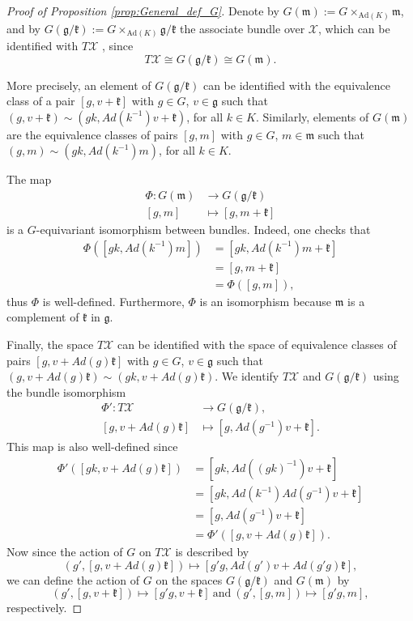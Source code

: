 \documentclass[oneside,11pt]{amsart}
\theoremstyle{definition}
\theoremstyle{remark}
\numberwithin{thm}{section}
\numberwithin{equation}{section}
\begin{document}
\begin{proof}[Proof of Proposition \ref{prop:General_def_G}]
Denote by $G(\mathfrak{m}):=G\times_{\mathrm{Ad}(K)}\mathfrak{m}$, and by $G(\mathfrak{g}/\mathfrak{k}):=G\times_{\mathrm{Ad}(K)}\mathfrak{g}/\mathfrak{k}$ the associate bundle over $\mathcal{X}$, which can be identified with $T\mathcal{X}$ {\cite[Section 1]{BR90}}, since
\begin{equation}\label{identification of TX}
    T\mathcal{X}\cong G(\mathfrak{g}/\mathfrak{k})\cong G(\mathfrak{m}).
\end{equation}

\noindent More precisely, an element of $G(\mathfrak{g}/\mathfrak{k})$ can be identified with the equivalence class of a pair $[g,v+\mathfrak{k}]$ with $g\in G$, $v\in\mathfrak g$ such that $(g,v+\mathfrak{k})\sim (gk,Ad(k^{-1})v+\mathfrak{k})$, for all $k\in K$.
Similarly, elements of $G(\mathfrak{m})$ are the equivalence classes of pairs $[g,m]$ with $g\in G$, $m\in\mathfrak m$ such that $(g,m)\sim (gk,Ad(k^{-1})m)$, for all $k\in K$. 

\noindent The map 
\begin{align*}
    \Phi\colon G(\mathfrak{m})&\to G(\mathfrak{g}/\mathfrak{k})\\
    [g,m]&\mapsto [g,m+\mathfrak k]
\end{align*}
is a $G$-equivariant isomorphism between bundles. Indeed, one checks that 
\begin{align*}
    \Phi([gk,Ad(k^{-1})m])&=[gk,Ad(k^{-1})m+\mathfrak k]\\
    &=[g,m+\mathfrak k]\\
    &=\Phi([g,m]),
\end{align*}
thus $\Phi$ is well-defined. Furthermore, $\Phi$ is an isomorphism because $\mathfrak m$ is a complement of $\mathfrak k$ in $\mathfrak g$. 

\noindent Finally, the space $T\mathcal X$ can be identified with the space of equivalence classes of pairs $[g,v+Ad(g)\mathfrak k]$ with $g\in G$, $v\in\mathfrak g$ such that $(g,v+Ad(g)\mathfrak k)\sim (gk,v+Ad(g)\mathfrak k)$. We identify $T\mathcal X$ and $G(\mathfrak{g}/\mathfrak{k})$ using the bundle isomorphism 
\begin{align*}
\Phi'\colon T\mathcal X & \to G(\mathfrak{g}/\mathfrak{k}),\\ [g,v+Ad(g)\mathfrak k] & \mapsto [g,Ad(g^{-1})v+\mathfrak k].
\end{align*} 
This map is also well-defined since
\begin{align*}
\Phi'([gk,v+Ad(g)\mathfrak k]) & =[gk,Ad((gk)^{-1})v+\mathfrak k]\\
& = [gk,Ad(k^{-1})Ad(g^{-1})v+\mathfrak k]\\
& = [g,Ad(g^{-1})v+\mathfrak k]\\
& = \Phi'([g,v+Ad(g)\mathfrak k]).
\end{align*}
Now since the action of $G$ on $T\mathcal X$ is described by 
\[(g',[g,v+Ad(g)\mathfrak{k}])\mapsto [g'g,Ad(g')v+Ad(g'g)\mathfrak k],\] 
we can define the action of $G$ on the spaces $G(\mathfrak{g}/\mathfrak{k})$ and $G(\mathfrak{m})$ by 
\[(g',[g,v+\mathfrak k])\mapsto[g'g,v+\mathfrak k]\ \mathrm{ and }\ (g',[g,m])\mapsto[g'g,m],\]
respectively. 


\end{proof}
\end{document}
